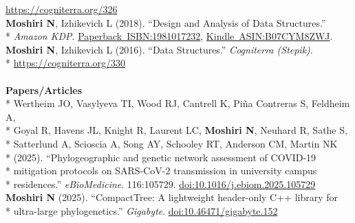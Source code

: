 \documentclass[margin,line]{res}
\begin{document}
\begin{resume}
\hspace*{8mm} \href{https://cogniterra.org/326}{https://cogniterra.org/326}\\
\hspace*{4mm} \textbf{Moshiri N}, Izhikevich L (2018). ``Design and Analysis of Data Structures.''\\*\vspace{2mm}
\hspace*{8mm} \textit{Amazon KDP}. \href{https://www.amazon.com/dp/1981017232}{Paperback~ISBN:1981017232}, \href{https://www.amazon.com/dp/B07CYM8ZWJ}{Kindle~ASIN:B07CYM8ZWJ}.\\
\hspace*{4mm} \textbf{Moshiri N}, Izhikevich L (2016). ``Data Structures.'' \textit{Cogniterra (Stepik)}.\\*\vspace{2mm}
\hspace*{8mm} \href{https://cogniterra.org/330}{https://cogniterra.org/330}\\
~\\
\textbf{Papers/Articles}\vspace{2mm}\\*
\hspace*{4mm} Wertheim JO, Vasylyeva TI, Wood RJ, Cantrell K, Pi{\~n}a Contreras S, Feldheim A,\\*
\hspace*{9.5mm} Goyal R, Havens JL, Knight R, Laurent LC, \textbf{Moshiri N}, Neuhard R, Sathe S,\\*
\hspace*{9.5mm} Satterlund A, Scioscia A, Song AY, Schooley RT, Anderson CM, Martin NK\\*
\hspace*{9.5mm} (2025). ``Phylogeographic and genetic network assessment of COVID-19\\*
\hspace*{9.5mm} mitigation protocols on SARS-CoV-2 transmission in university campus\\*\vspace{2mm}
\hspace*{8mm} residences.'' \textit{eBioMedicine}. 116:105729. \href{https://doi.org/10.1016/j.ebiom.2025.105729}{doi:10.1016/j.ebiom.2025.105729}\\
\hspace*{4mm} \textbf{Moshiri N} (2025). ``CompactTree: A lightweight header-only C++ library for\\*\vspace{2mm}
\hspace*{8mm} ultra-large phylogenetics.'' \textit{Gigabyte}. \href{https://doi.org/10.46471/gigabyte.152}{doi:10.46471/gigabyte.152}\\

\end{resume}
\end{document}
